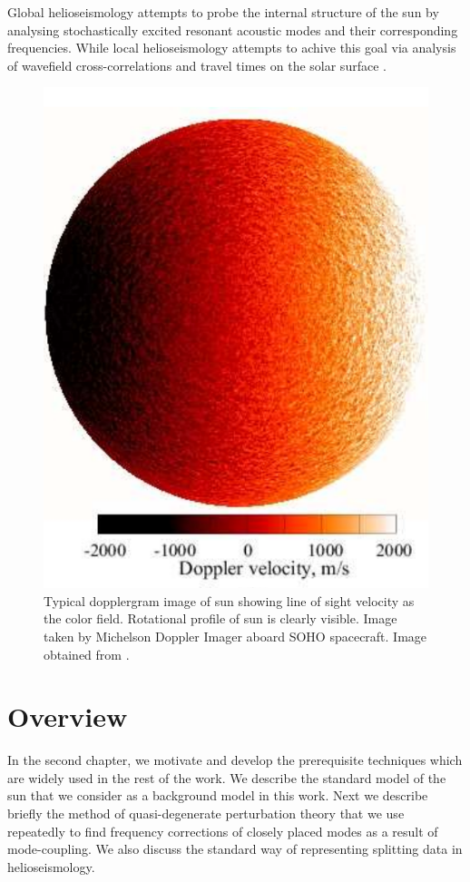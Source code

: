 Global helioseismology attempts to probe the internal structure of the sun by analysing stochastically excited resonant acoustic  modes and their corresponding frequencies. While local helioseismology attempts to achive this goal via analysis of wavefield cross-correlations and travel times on the solar surface \cite{gizon02}.
\begin{figure}[h]
\includegraphics[scale=0.5,center]{Chapter1/figs/sun_doppler}
\caption{Typical dopplergram image of sun showing line of sight velocity as the color field. Rotational profile of sun is clearly visible. Image taken by Michelson Doppler Imager aboard SOHO spacecraft. Image obtained from \cite{Kosovichev2011}.}
\label{fig:sun_doppler}
\end{figure}

\section{Overview}
In the second chapter, we motivate and develop the prerequisite techniques which are widely used in the rest of the work. We describe the standard model of the sun that we consider as a background model in this work. Next we describe briefly the method of quasi-degenerate perturbation theory that we use repeatedly to find frequency corrections of closely placed modes as a result of mode-coupling. We also discuss the standard way of representing splitting data in helioseismology.

